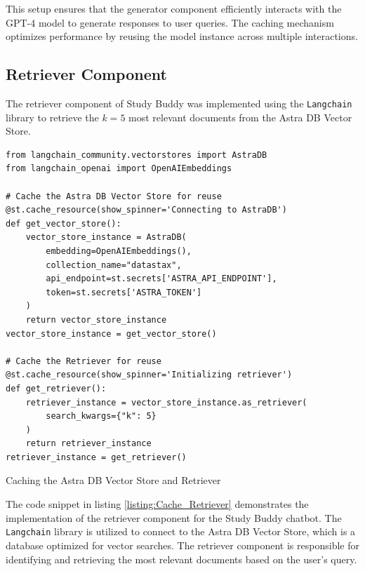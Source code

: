 This setup ensures that the generator component efficiently interacts with the GPT-4 model to generate responses to user queries. The caching mechanism optimizes performance by reusing the model instance across multiple interactions.

        
\subsection{Retriever Component}
The retriever component of Study Buddy was implemented using the \texttt{Langchain} library to retrieve the \(k = 5\) most relevant documents from the Astra DB Vector Store.

\begin{listing}[H]
\begin{verbatim}
from langchain_community.vectorstores import AstraDB
from langchain_openai import OpenAIEmbeddings

# Cache the Astra DB Vector Store for reuse
@st.cache_resource(show_spinner='Connecting to AstraDB')
def get_vector_store():
    vector_store_instance = AstraDB(
        embedding=OpenAIEmbeddings(),
        collection_name="datastax",
        api_endpoint=st.secrets['ASTRA_API_ENDPOINT'],
        token=st.secrets['ASTRA_TOKEN']
    )
    return vector_store_instance
vector_store_instance = get_vector_store()

# Cache the Retriever for reuse
@st.cache_resource(show_spinner='Initializing retriever')
def get_retriever():
    retriever_instance = vector_store_instance.as_retriever(
        search_kwargs={"k": 5}
    )
    return retriever_instance
retriever_instance = get_retriever()
\end{verbatim}
\caption{Caching the Astra DB Vector Store and Retriever}
\label{listing:Cache_Retriever}
\end{listing}

The code snippet in listing \ref{listing:Cache_Retriever} demonstrates the implementation of the retriever component for the Study Buddy chatbot. The \texttt{Langchain} library is utilized to connect to the Astra DB Vector Store, which is a database optimized for vector searches. The retriever component is responsible for identifying and retrieving the most relevant documents based on the user's query.

